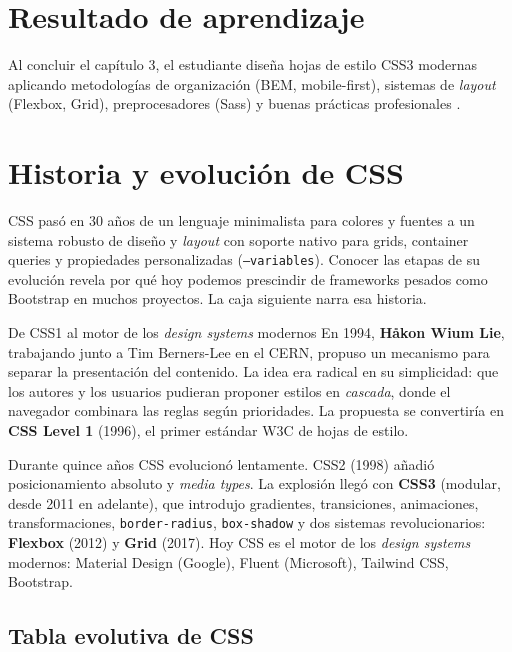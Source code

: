 \section*{Resultado de aprendizaje}
Al concluir el capítulo 3, el estudiante diseña hojas de estilo CSS3
modernas aplicando metodologías de organización (BEM, mobile-first),
sistemas de \emph{layout} (Flexbox, Grid), preprocesadores (Sass) y
buenas prácticas profesionales \cite{macdonald2018css,frain2020responsive}.

\section{Historia y evolución de CSS}

CSS pasó en 30 años de un lenguaje minimalista para colores y
fuentes a un sistema robusto de diseño y \emph{layout} con soporte
nativo para grids, container queries y propiedades personalizadas
(\texttt{--variables}). Conocer las etapas de su evolución revela
por qué hoy podemos prescindir de frameworks pesados como Bootstrap
en muchos proyectos. La caja siguiente narra esa historia.


\begin{cajahistoria}{De CSS1 al motor de los \emph{design systems} modernos}
En 1994, \textbf{Håkon Wium Lie}, trabajando junto a Tim Berners-Lee
en el CERN, propuso un mecanismo para separar la presentación del
contenido. La idea era radical en su simplicidad: que los autores y
los usuarios pudieran proponer estilos en \emph{cascada}, donde el
navegador combinara las reglas según prioridades. La propuesta se
convertiría en \textbf{CSS Level 1} (1996), el primer estándar W3C de
hojas de estilo.

Durante quince años CSS evolucionó lentamente. CSS2 (1998) añadió
posicionamiento absoluto y \emph{media types}. La explosión llegó con
\textbf{CSS3} (modular, desde 2011 en adelante), que introdujo
gradientes, transiciones, animaciones, transformaciones,
\texttt{border-radius}, \texttt{box-shadow} y dos sistemas
revolucionarios: \textbf{Flexbox} (2012) y \textbf{Grid} (2017). Hoy
CSS es el motor de los \emph{design systems} modernos: Material
Design (Google), Fluent (Microsoft), Tailwind CSS, Bootstrap.
\end{cajahistoria}

\subsection{Tabla evolutiva de CSS}

